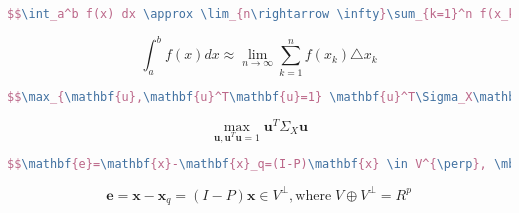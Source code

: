     \begin{lstlisting}[language=TeX,numbers=none,frame=lrtb,keywords={begin},label=upanddown,caption=\song 上下限的使用] 
 $$\int_a^b f(x) dx \approx \lim_{n\rightarrow \infty}\sum_{k=1}^n f(x_k)\triangle x_k$$
  \end{lstlisting} 
  $$\int_a^b f(x) dx \approx \lim_{n\rightarrow \infty}\sum_{k=1}^n f(x_k)\triangle x_k$$
  
  \begin{lstlisting}[language=TeX,numbers=none,frame=lrtb,keywords={begin},label=bast,caption=\song 最佳化问题] 
   $$\max_{\mathbf{u},\mathbf{u}^T\mathbf{u}=1} \mathbf{u}^T\Sigma_X\mathbf{u}$$
  \end{lstlisting} 
  $$\max_{\mathbf{u},\mathbf{u}^T\mathbf{u}=1} \mathbf{u}^T\Sigma_X\mathbf{u}$$
  
  \begin{lstlisting}[language=TeX,numbers=none,frame=lrtb,keywords={begin},label=somesymbles,caption=\song 几个符号]
  $$\mathbf{e}=\mathbf{x}-\mathbf{x}_q=(I-P)\mathbf{x} \in V^{\perp}, \mbox{where}\; V\oplus V^{\perp}=R^p $$
  \end{lstlisting} 
  $$\mathbf{e}=\mathbf{x}-\mathbf{x}_q=(I-P)\mathbf{x} \in V^{\perp}, \mbox{where}\; V\oplus V^{\perp}=R^p $$


